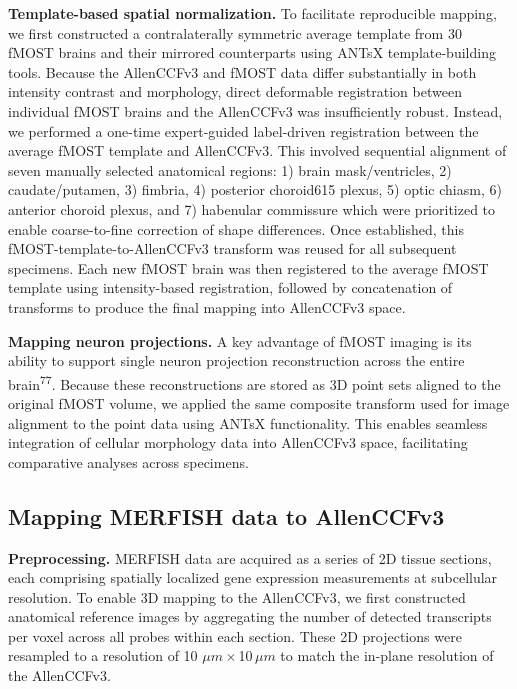 \documentclass[
  12pt,
]{article}
\begin{document}
\textbf{Template-based spatial normalization.} To facilitate
reproducible mapping, we first constructed a contralaterally symmetric
average template from 30 fMOST brains and their mirrored counterparts
using ANTsX template-building tools. Because the AllenCCFv3 and fMOST
data differ substantially in both intensity contrast and morphology,
direct deformable registration between individual fMOST brains and the
AllenCCFv3 was insufficiently robust. Instead, we performed a one-time
expert-guided label-driven registration between the average fMOST
template and AllenCCFv3. This involved sequential alignment of seven
manually selected anatomical regions: 1) brain mask/ventricles, 2)
caudate/putamen, 3) fimbria, 4) posterior choroid615 plexus, 5) optic
chiasm, 6) anterior choroid plexus, and 7) habenular commissure which
were prioritized to enable coarse-to-fine correction of shape
differences. Once established, this fMOST-template-to-AllenCCFv3
transform was reused for all subsequent specimens. Each new fMOST brain
was then registered to the average fMOST template using intensity-based
registration, followed by concatenation of transforms to produce the
final mapping into AllenCCFv3 space.

\textbf{Mapping neuron projections.} A key advantage of fMOST imaging is
its ability to support single neuron projection reconstruction across
the entire brain\textsuperscript{77}. Because these reconstructions are
stored as 3D point sets aligned to the original fMOST volume, we applied
the same composite transform used for image alignment to the point data
using ANTsX functionality. This enables seamless integration of cellular
morphology data into AllenCCFv3 space, facilitating comparative analyses
across specimens.

\subsection{Mapping MERFISH data to
AllenCCFv3}\label{mapping-merfish-data-to-allenccfv3}

\textbf{Preprocessing.} MERFISH data are acquired as a series of 2D
tissue sections, each comprising spatially localized gene expression
measurements at subcellular resolution. To enable 3D mapping to the
AllenCCFv3, we first constructed anatomical reference images by
aggregating the number of detected transcripts per voxel across all
probes within each section. These 2D projections were resampled to a
resolution of 10 \(\mu m\)\,\(\times\)\,10\,\(\mu m\) to match the
in-plane resolution of the AllenCCFv3.
\end{document}
